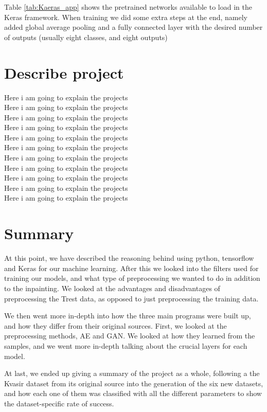 Table \ref{tab:Kaeras_app} shows the pretrained networks available to load in the Keras framework. 
When training we did some extra steps at the end, namely added global average pooling and a fully connected layer with the desired number of outputs (usually eight classes, and eight outputs)




\section{Describe project}
Here i am going to explain the projects\\
Here i am going to explain the projects\\
Here i am going to explain the projects\\
Here i am going to explain the projects\\
Here i am going to explain the projects\\
Here i am going to explain the projects\\
Here i am going to explain the projects\\
Here i am going to explain the projects\\
Here i am going to explain the projects\\
Here i am going to explain the projects\\
Here i am going to explain the projects\\

\section{Summary}
At this point, we have described the reasoning behind using python, tensorflow and Keras for our machine learning. 
After this we looked into the filters used for training our models, and what type of preprocessing we wanted to do in addition to the inpainting. We looked at the advantages and disadvantages of preprocessing the Trest data, as opposed to just preprocessing the training data.

We then went more in-depth into how the three main programs were built up, and how they differ from their original sources.
First, we looked at the preprocessing methods, AE and GAN. We looked at how they learned from the samples, and we went more in-depth talking about the crucial layers for each model.

At last, we ended up giving a summary of the project as a whole, following a the Kvasir dataset from its original source into the generation of the six new datasets, and how each one of them was classified with all the different parameters to show the dataset-specific rate of success.

 
